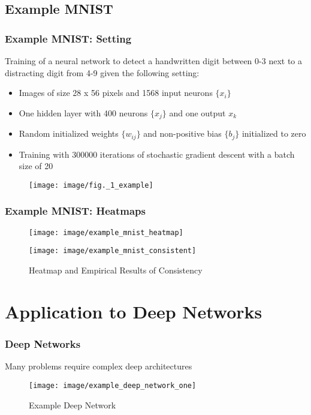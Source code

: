 \documentclass{beamer}
\begin{document}
\subsection[Example MINST]{Example MNIST}



\begin{frame}
\frametitle{Example MNIST: Setting}
\vspace{0.5cm}
Training of a neural network to detect a handwritten digit between 0-3 next to a distracting digit from 4-9 given the following setting:
\begin{itemize}
\item Images of size 28 x 56 pixels and 1568 input neurons $\{x_i\}$
\item One hidden layer with 400 neurons $\{x_j\}$ and one output $x_k$
\item Random initialized weights $\{w_{ij}\}$ and non-positive bias $\{b_j\}$ initialized to zero
\item Training with 300000 iterations of stochastic gradient descent with a batch size of 20 
\end{itemize}
\begin{figure}
\texttt{[image: image/fig.\_1\_example]}

\end{figure}
\end{frame}


\begin{frame}
\frametitle{Example MNIST: Heatmaps}
\vspace{0.5cm}
\begin{figure}
\texttt{[image: image/example\_mnist\_heatmap]}
\end{figure}
\pause
\begin{figure}
\texttt{[image: image/example\_mnist\_consistent]}
\vspace{-0.75cm}
\caption{Heatmap and Empirical Results of Consistency}
\end{figure}


\end{frame}



\section[Application to Deep Networks]{Application to Deep Networks}


\begin{frame}
\frametitle{Deep Networks}
Many problems require complex deep architectures

\begin{figure}
\label{fig1}
\texttt{[image: image/example\_deep\_network\_one]}
\vspace{-0.25cm}
\caption{Example Deep Network}

\end{figure}

\vspace{-1cm}
\end{frame}
\end{document}

